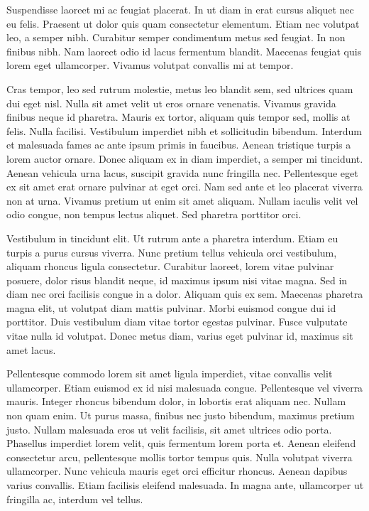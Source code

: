 Suspendisse laoreet mi ac feugiat placerat. In ut diam in erat cursus aliquet nec eu felis. Praesent ut dolor quis quam consectetur elementum. Etiam nec volutpat leo, a semper nibh. Curabitur semper condimentum metus sed feugiat. In non finibus nibh. Nam laoreet odio id lacus fermentum blandit. Maecenas feugiat quis lorem eget ullamcorper. Vivamus volutpat convallis mi at tempor.

Cras tempor, leo sed rutrum molestie, metus leo blandit sem, sed ultrices quam dui eget nisl. Nulla sit amet velit ut eros ornare venenatis. Vivamus gravida finibus neque id pharetra. Mauris ex tortor, aliquam quis tempor sed, mollis at felis. Nulla facilisi. Vestibulum imperdiet nibh et sollicitudin bibendum. Interdum et malesuada fames ac ante ipsum primis in faucibus. Aenean tristique turpis a lorem auctor ornare. Donec aliquam ex in diam imperdiet, a semper mi tincidunt. Aenean vehicula urna lacus, suscipit gravida nunc fringilla nec. Pellentesque eget ex sit amet erat ornare pulvinar at eget orci. Nam sed ante et leo placerat viverra non at urna. Vivamus pretium ut enim sit amet aliquam. Nullam iaculis velit vel odio congue, non tempus lectus aliquet. Sed pharetra porttitor orci.

Vestibulum in tincidunt elit. Ut rutrum ante a pharetra interdum. Etiam eu turpis a purus cursus viverra. Nunc pretium tellus vehicula orci vestibulum, aliquam rhoncus ligula consectetur. Curabitur laoreet, lorem vitae pulvinar posuere, dolor risus blandit neque, id maximus ipsum nisi vitae magna. Sed in diam nec orci facilisis congue in a dolor. Aliquam quis ex sem. Maecenas pharetra magna elit, ut volutpat diam mattis pulvinar. Morbi euismod congue dui id porttitor. Duis vestibulum diam vitae tortor egestas pulvinar. Fusce vulputate vitae nulla id volutpat. Donec metus diam, varius eget pulvinar id, maximus sit amet lacus.

Pellentesque commodo lorem sit amet ligula imperdiet, vitae convallis velit ullamcorper. Etiam euismod ex id nisi malesuada congue. Pellentesque vel viverra mauris. Integer rhoncus bibendum dolor, in lobortis erat aliquam nec. Nullam non quam enim. Ut purus massa, finibus nec justo bibendum, maximus pretium justo. Nullam malesuada eros ut velit facilisis, sit amet ultrices odio porta. Phasellus imperdiet lorem velit, quis fermentum lorem porta et. Aenean eleifend consectetur arcu, pellentesque mollis tortor tempus quis. Nulla volutpat viverra ullamcorper. Nunc vehicula mauris eget orci efficitur rhoncus. Aenean dapibus varius convallis. Etiam facilisis eleifend malesuada. In magna ante, ullamcorper ut fringilla ac, interdum vel tellus.

